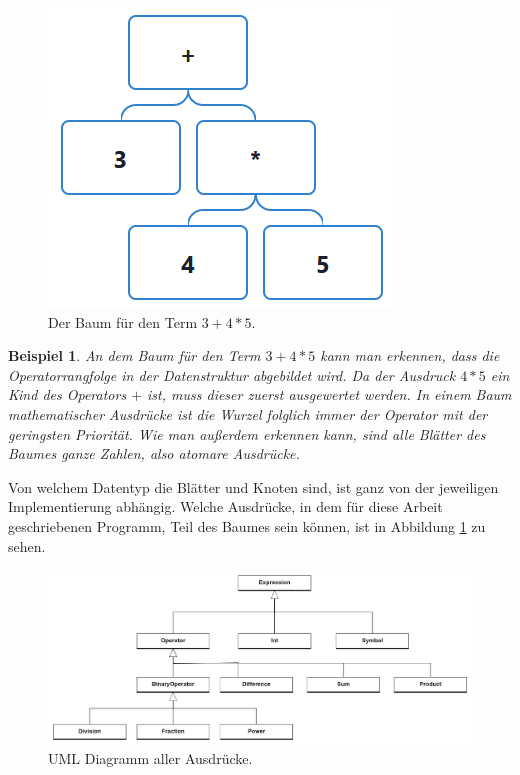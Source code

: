 \documentclass[11pt]{article}
\newtheorem{example}{Beispiel}
\begin{document}
\begin{figure}[h]
  \centering
  \includegraphics[scale=0.5]{trees/beispiel_1_baum.png}
  \caption{Der Baum für den Term $3+4*5$.}
\end{figure}

\begin{example} \normalfont
   An dem Baum für den Term $3+4*5$ kann man erkennen, dass die Operatorrangfolge 
   in der Datenstruktur abgebildet wird. Da der Ausdruck $4*5$ ein Kind des Operators $+$ ist, muss dieser zuerst 
   ausgewertet werden. In einem Baum mathematischer Ausdrücke ist die Wurzel folglich immer
   der Operator mit der geringsten Priorität.
   Wie man außerdem erkennen kann, sind alle Blätter des Baumes ganze Zahlen, also atomare Ausdrücke.
\end{example}

Von welchem Datentyp die Blätter und Knoten sind, ist ganz von der jeweiligen Implementierung abhängig.
Welche Ausdrücke, in dem für diese Arbeit geschriebenen Programm, Teil des Baumes sein können, ist in 
Abbildung \ref{img:uml} zu sehen.

\begin{figure}[h]
  \centering
  \includegraphics[scale=0.25]{UML_Ausdruecke.png}
  \caption{UML Diagramm aller Ausdrücke.}
  \label{img:uml}
\end{figure}
\end{document}
